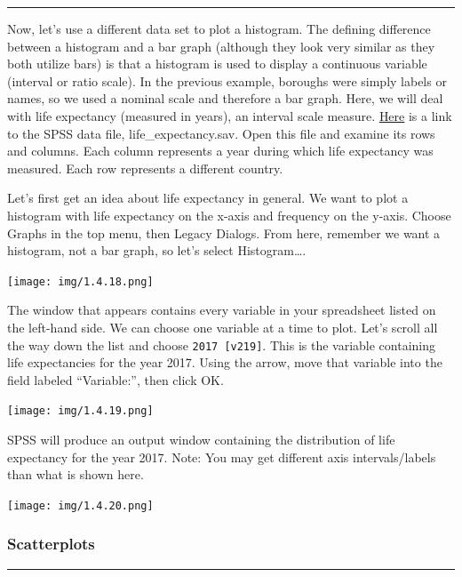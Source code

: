 \documentclass[]{book}
\begin{document}
\begin{center}\rule{0.5\linewidth}{0.5pt}\end{center}

Now, let's use a different data set to plot a histogram. The defining
difference between a histogram and a bar graph (although they look very
similar as they both utilize bars) is that a histogram is used to
display a continuous variable (interval or ratio scale). In the previous
example, boroughs were simply labels or names, so we used a nominal
scale and therefore a bar graph. Here, we will deal with life expectancy
(measured in years), an interval scale measure.
\href{https://github.com/CrumpLab/statisticsLab/blob/master/data/spssdata/life_expectancy.sav}{Here}
is a link to the SPSS data file, life\_expectancy.sav. Open this file
and examine its rows and columns. Each column represents a year during
which life expectancy was measured. Each row represents a different
country.

Let's first get an idea about life expectancy in general. We want to
plot a histogram with life expectancy on the x-axis and frequency on the
y-axis. Choose {Graphs} in the top menu, then {Legacy Dialogs}. From
here, remember we want a histogram, not a bar graph, so let's select
{Histogram\ldots{}}.

\texttt{[image: img/1.4.18.png]}

The window that appears contains every variable in your spreadsheet
listed on the left-hand side. We can choose one variable at a time to
plot. Let's scroll all the way down the list and choose
\texttt{2017\ {[}v219{]}}. This is the variable containing life
expectancies for the year 2017. Using the arrow, move that variable into
the field labeled ``Variable:'', then click {OK}.

\texttt{[image: img/1.4.19.png]}

SPSS will produce an output window containing the distribution of life
expectancy for the year 2017. Note: You may get different axis
intervals/labels than what is shown here.

\texttt{[image: img/1.4.20.png]}

\subsubsection{Scatterplots}\label{scatterplots}

\begin{center}\rule{0.5\linewidth}{0.5pt}\end{center}
\end{document}
